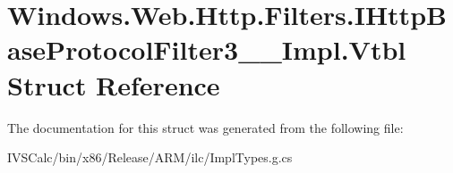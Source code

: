 \hypertarget{struct_windows_1_1_web_1_1_http_1_1_filters_1_1_i_http_base_protocol_filter3_____impl_1_1_vtbl}{}\section{Windows.\+Web.\+Http.\+Filters.\+I\+Http\+Base\+Protocol\+Filter3\+\_\+\+\_\+\+Impl.\+Vtbl Struct Reference}
\label{struct_windows_1_1_web_1_1_http_1_1_filters_1_1_i_http_base_protocol_filter3_____impl_1_1_vtbl}


The documentation for this struct was generated from the following file\+:\begin{DoxyCompactItemize}
\item 
I\+V\+S\+Calc/bin/x86/\+Release/\+A\+R\+M/ilc/Impl\+Types.\+g.\+cs\end{DoxyCompactItemize}
